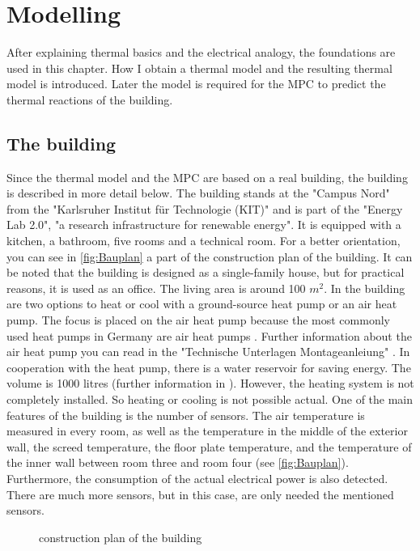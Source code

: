 \chapter{Modelling}
\label{ch:modelling}
After explaining thermal basics and the electrical analogy, the foundations are used in this chapter. How I obtain a thermal model and the resulting thermal model is introduced. Later the model is required for the MPC to predict the thermal reactions of the building. 

\section{The building}
\label{section:building}
    Since the thermal model and the MPC are based on a real building, the building is described in more detail below.
    \newline
    The building stands at the "Campus Nord" from the "Karlsruher Institut für Technologie (KIT)" and is part of the "Energy Lab 2.0", "a research infrastructure for renewable energy"\cite{KIT.2021}. It is equipped with a kitchen, a bathroom, five rooms and a technical room. For a better orientation, you can see in \autoref{fig:Bauplan} a part of the construction plan of the building. It can be noted that the building is designed as a single-family house, but for practical reasons, it is used as an office. The living area is around 100 $m^2$. In the building are two options to heat or cool with a ground-source heat pump or an air heat pump. The focus is placed on the air heat pump because the most commonly used heat pumps in Germany are air heat pumps \cite{bwp.2021}. Further information about the air heat pump you can read in the "Technische Unterlagen Montageanleiung" \cite{TUM}. In cooperation with the heat pump, there is a water reservoir for saving energy. The volume is 1000 litres (further information in \cite{Oskar}). However, the heating system is not completely installed. So heating or cooling is not possible actual.
    \newline
    One of the main features of the building is the number of sensors. The air temperature is measured in every room, as well as the temperature in the middle of the exterior wall, the screed temperature, the floor plate temperature, and the temperature of the inner wall between room three and room four (see \autoref{fig:Bauplan}). Furthermore, the consumption of the actual electrical power is also detected. There are much more sensors, but in this case, are only needed the mentioned sensors. 
    \begin{figure}
        \centering
        \def\svgwidth{320pt}
        
        \caption{construction plan of the building \cite{Bauplan}}
        \label{fig:Bauplan}
    \end{figure}
    
